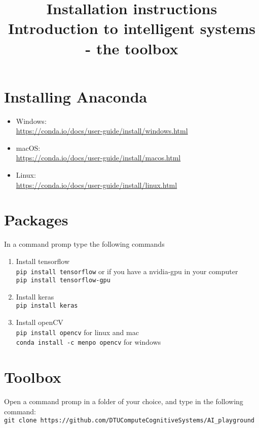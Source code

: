 \documentclass[10pt,a4paper]{article}
\title{Installation instructions \\ \vspace{0.5cm}
	   \normalsize Introduction to intelligent systems - the toolbox
	   \vspace{-1cm}}
\begin{document}
\maketitle
\hline

\section{Installing Anaconda}
\begin{itemize}
\item Windows: \\
	\url{https://conda.io/docs/user-guide/install/windows.html}
\item macOS: \\
	\url{https://conda.io/docs/user-guide/install/macos.html}
\item Linux: \\
	\url{https://conda.io/docs/user-guide/install/linux.html}
\end{itemize}

\section{Packages}
In a command promp type the following commands
\begin{enumerate}
\item Install tensorflow \\
	\texttt{pip install tensorflow} or if you have a nvidia-gpu in your computer \\
	\texttt{pip install tensorflow-gpu}
\item Install keras \\
	\texttt{pip install keras}
\item Install openCV \\
	\texttt{pip install opencv} for linux and mac \\
	\texttt{conda install -c menpo opencv} for windows
\end{enumerate}

\section{Toolbox}
Open a command promp in a folder of your choice, and type in the following command: \\
\texttt{git clone https://github.com/DTUComputeCognitiveSystems/AI\_playground}
\end{document}
